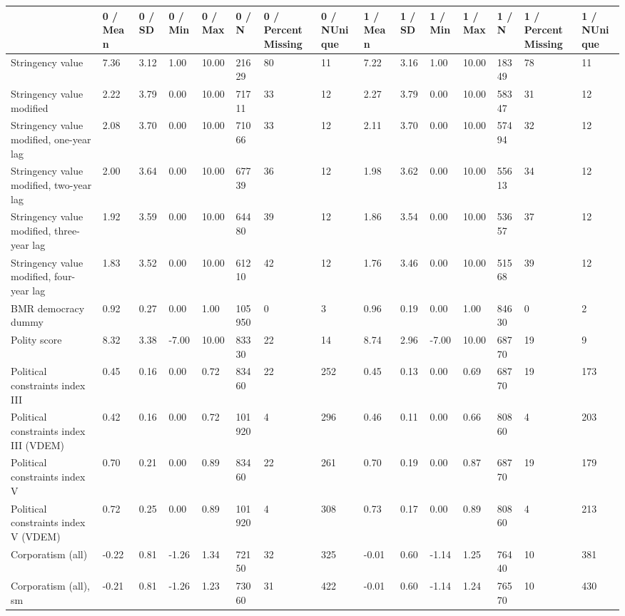 
\begin{longtable}{lllllllllllllll}
\toprule
  & 0 / Mean & 0 / SD & 0 / Min & 0 / Max & 0 / N & 0 / PercentMissing & 0 / NUnique & 1 / Mean & 1 / SD & 1 / Min & 1 / Max & 1 / N & 1 / PercentMissing & 1 / NUnique\\
\midrule
Stringency value & 7.36 & 3.12 & 1.00 & 10.00 & 21629 & 80 & 11 & 7.22 & 3.16 & 1.00 & 10.00 & 18349 & 78 & 11\\
Stringency value modified & 2.22 & 3.79 & 0.00 & 10.00 & 71711 & 33 & 12 & 2.27 & 3.79 & 0.00 & 10.00 & 58347 & 31 & 12\\
Stringency value modified, one-year lag & 2.08 & 3.70 & 0.00 & 10.00 & 71066 & 33 & 12 & 2.11 & 3.70 & 0.00 & 10.00 & 57494 & 32 & 12\\
Stringency value modified, two-year lag & 2.00 & 3.64 & 0.00 & 10.00 & 67739 & 36 & 12 & 1.98 & 3.62 & 0.00 & 10.00 & 55613 & 34 & 12\\
Stringency value modified, three-year lag & 1.92 & 3.59 & 0.00 & 10.00 & 64480 & 39 & 12 & 1.86 & 3.54 & 0.00 & 10.00 & 53657 & 37 & 12\\
\addlinespace
Stringency value modified, four-year lag & 1.83 & 3.52 & 0.00 & 10.00 & 61210 & 42 & 12 & 1.76 & 3.46 & 0.00 & 10.00 & 51568 & 39 & 12\\
BMR democracy dummy & 0.92 & 0.27 & 0.00 & 1.00 & 105950 & 0 & 3 & 0.96 & 0.19 & 0.00 & 1.00 & 84630 & 0 & 2\\
Polity score & 8.32 & 3.38 & -7.00 & 10.00 & 83330 & 22 & 14 & 8.74 & 2.96 & -7.00 & 10.00 & 68770 & 19 & 9\\
Political constraints index III & 0.45 & 0.16 & 0.00 & 0.72 & 83460 & 22 & 252 & 0.45 & 0.13 & 0.00 & 0.69 & 68770 & 19 & 173\\
Political constraints index III (VDEM) & 0.42 & 0.16 & 0.00 & 0.72 & 101920 & 4 & 296 & 0.46 & 0.11 & 0.00 & 0.66 & 80860 & 4 & 203\\
\addlinespace
Political constraints index V & 0.70 & 0.21 & 0.00 & 0.89 & 83460 & 22 & 261 & 0.70 & 0.19 & 0.00 & 0.87 & 68770 & 19 & 179\\
Political constraints index V (VDEM) & 0.72 & 0.25 & 0.00 & 0.89 & 101920 & 4 & 308 & 0.73 & 0.17 & 0.00 & 0.89 & 80860 & 4 & 213\\
Corporatism (all) & -0.22 & 0.81 & -1.26 & 1.34 & 72150 & 32 & 325 & -0.01 & 0.60 & -1.14 & 1.25 & 76440 & 10 & 381\\
Corporatism (all), sm & -0.21 & 0.81 & -1.26 & 1.23 & 73060 & 31 & 422 & -0.01 & 0.60 & -1.14 & 1.24 & 76570 & 10 & 430\\

\end{longtable}
